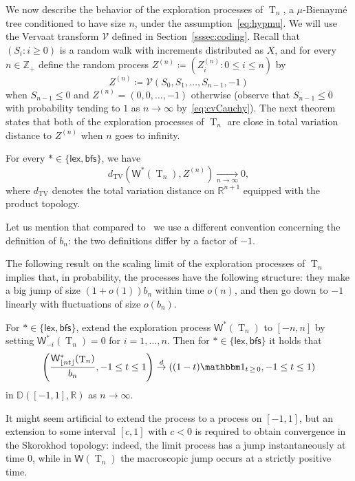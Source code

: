\documentclass[AHL,Unicode,longabstracts,published]{cedram}
\newcommand{\R}{\mathbb{R}}
\newcommand{\Z}{\mathbb{Z}}
\newcommand{\D}{\mathbb{D}}
\newcommand*\W{\mathsf{W}}
\newcommand{\bfs}{\mathsf{bfs}}
\newcommand{\lex}{\mathsf{lex}}
\DeclareMathOperator{\rtree}{T}
\DeclareMathOperator{\TV}{TV}
\newcommand{\cV}{\mathcal{V}}
\newcommand{\I}[1]{{\mathbbm 1}_{#1}}
\begin{document}
We now describe the behavior of the exploration processes of $ \rtree_{n}$, a $\mu$-Bienaymé tree conditioned to have size $n$, under the assumption~\eqref{eq:hypmu}. We will use the Vervaat transform $\cV$ defined in Section~\ref{sssec:coding}. Recall that $(S_i : i \geq 0)$ is a random walk with increments distributed as $X$, and for every $n\in\Z_+$ define the random process $Z^{(n)} \coloneqq (Z^{(n)}_{i} : 0\leq i \leq n)$ by
\begin{equation}\label{eqn:ZnVervaat}
Z^{(n)} \coloneqq \cV(S_0,S_1,\ldots,S_{n-1},-1)
\end{equation}
when $S_{n-1} \leq 0$ and $Z^{(n)}=(0,0, \ldots,-1)$ otherwise (observe that $S_{n-1} \leq 0$ with probability tending to $1$ as $ n \rightarrow \infty$ by~\eqref{eq:cvCauchy}). The next theorem states that both of the exploration processes of $ \rtree_{n}$ are close in total variation distance to $Z^{(n)}$ when $n$ goes to infinity.
\begin{theo}[{\cite[Theorem~21]{KR19}}]\label{thm:dTVLoc}
For every $\ast \in \{\lex,\bfs\}$, we have
\[
d_{\TV}\left(\W^{\ast}(\rtree_{n}), Z^{(n)}\right) \xrightarrow[n\to\infty]{} 0,
\]
where $d_{\TV}$ denotes the total variation distance on $\R^{n+1}$ equipped with the product topology.
\end{theo}

Let us mention that compared to~\cite{KR19} we use a different convention concerning the definition of $b_{n}$: the two definitions differ by a factor of $-1$.

The following result on the scaling limit of the exploration processes of $ \rtree_{ n}$ implies that, in probability, the processes have the following structure: they make a big jump of size $(1+o(1))b_n$ within time $o(n)$, and then go down to $-1$ linearly with fluctuations of size $o(b_n)$.

\begin{prop}[{\cite[Proposition~24]{KR19}}]\label{prop:functional_conv_W}
\label{prop:W}
For $\ast \in \{\lex,\bfs\}$, extend the exploration process $\W^{\ast}(\rtree_{ n})$ to $[-n,n]$ by setting $\W^{\ast}_{-i}(\rtree_{ n})=0$ for $i=1,\dots, n$. Then for $\ast \in \{\lex,\bfs\}$ it holds that
\[
\left(\frac{\W^{\ast}_{\lfloor n t \rfloor}(\rtree_{ n})}{b_n}, -1\leq t \leq 1 \right) \overset{d}{\to} \left((1-t)\I{t\,\geq\,0},-1\leq t \leq 1 \right)
\]
in $\D([-1,1],\R)$ as $n\to \infty$.
\end{prop}

It might seem artificial to extend the process to a process on $[-1,1]$, but an extension to some interval $[c,1]$ with $c <0$ is required to obtain convergence in the Skorokhod topology: indeed, the limit process has a jump instantaneously at time 0, while in $\W(\rtree_{ n})$ the macroscopic jump occurs at a strictly positive time.
\end{document}
